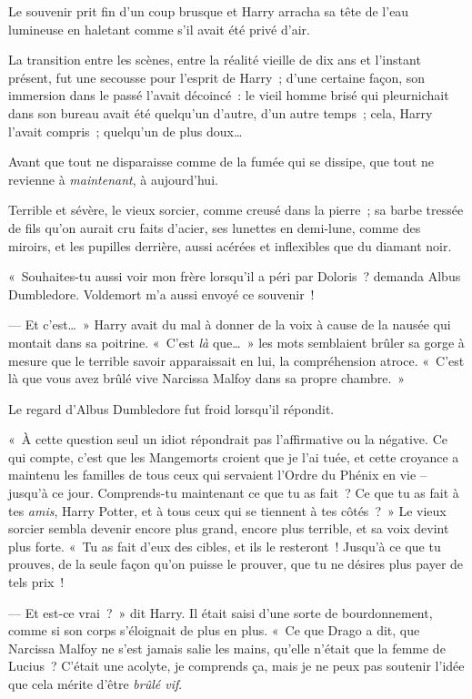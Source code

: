 \later

Le souvenir prit fin d'un coup brusque et Harry arracha sa tête de l'eau lumineuse en haletant comme s'il avait été privé d'air.

La transition entre les scènes, entre la réalité vieille de dix ans et l'instant présent, fut une secousse pour l'esprit de Harry~; d'une certaine façon, son immersion dans le passé l'avait décoincé~: le vieil homme brisé qui pleurnichait dans son bureau avait été quelqu'un d'autre, d'un autre temps~; cela, Harry l'avait compris~; quelqu'un de plus doux…

Avant que tout ne disparaisse comme de la fumée qui se dissipe, que tout ne revienne à \emph{maintenant}, à aujourd'hui.

Terrible et sévère, le vieux sorcier, comme creusé dans la pierre~; sa barbe tressée de fils qu'on aurait cru faits d'acier, ses lunettes en demi-lune, comme des miroirs, et les pupilles derrière, aussi acérées et inflexibles que du diamant noir.

«~Souhaites-tu aussi voir mon frère lorsqu'il a péri par Doloris~? demanda Albus Dumbledore. Voldemort m'a aussi envoyé ce souvenir~!

--- Et c'est…~» Harry avait du mal à donner de la voix à cause de la nausée qui montait dans sa poitrine. «~C'est \emph{là} que…~» les mots semblaient brûler sa gorge à mesure que le terrible savoir apparaissait en lui, la compréhension atroce. «~C'est là que vous avez brûlé vive Narcissa Malfoy dans sa propre chambre.~»

Le regard d'Albus Dumbledore fut froid lorsqu'il répondit.

«~À cette question seul un idiot répondrait pas l'affirmative ou la négative. Ce qui compte, c'est que les Mangemorts croient que je l'ai tuée, et cette croyance a maintenu les familles de tous ceux qui servaient l'Ordre du Phénix en vie -- jusqu'à ce jour. Comprends-tu maintenant ce que tu as fait~? Ce que tu as fait à tes \emph{amis}, Harry Potter, et à tous ceux qui se tiennent à tes côtés~?~» Le vieux sorcier sembla devenir encore plus grand, encore plus terrible, et sa voix devint plus forte. «~Tu as fait d'eux des cibles, et ils le resteront~! Jusqu'à ce que tu prouves, de la seule façon qu'on puisse le prouver, que tu ne désires plus payer de tels prix~!

--- Et est-ce vrai~?~» dit Harry. Il était saisi d'une sorte de bourdonnement, comme si son corps s'éloignait de plus en plus. «~Ce que Drago a dit, que Narcissa Malfoy ne s'est jamais salie les mains, qu'elle n'était que la femme de Lucius~? C'était une acolyte, je comprends ça, mais je ne peux pas soutenir l'idée que cela mérite d'être \emph{brûlé vif}.

